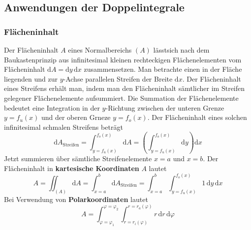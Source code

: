 \subsection{Anwendungen der Doppelintegrale}
\subsubsection{Flächeninhalt}
Der Flächeninhalt $A$ eines Normalbereichs $\left(A\right)$ lässtsich nach dem Baukastenprinzip aus infinitesimal kleinen rechteckigen Flächenelementen vom Flächeninhalt $\text{d}A=\text{d}y\,\text{d}x$ zusammensetzen. Man betrachte einen in der Fläche liegenden und zur $y$-Achse parallelen Streifen der Breite $\text{d}x$. Der Flächeninhalt eines Streifens erhält man, indem man den Flächeninhalt sämtlicher im Streifen gelegener Flächenelemente aufsummiert. Die Summation der Flächenelemente bedeutet eine Integration in der $y$-Richtung zwischen der unteren Grenze $y=f_u\left(x\right)$ und der oberen Grneze $y=f_o\left(x\right)$. Der Flächeninhalt eines solchen infinitesimal schmalen Streifens beträgt
\begin{equation}
\boxed{\text{d}A_{\text{Streifen}}=\displaystyle \int_{y=f_u\left(x\right)}^{f_o\left(x\right)}\text{d}A=\left(\displaystyle \int_{y=f_u\left(x\right)}^{f_o\left(x\right)}\text{d}y\right)\text{d}x}
\end{equation}
Jetzt summieren über sämtliche Streifenelemente $x=a$ und $x=b$. Der Flächeninhalt in \textbf{kartesische Koordinaten} $A$ lautet
\begin{equation}
\boxed{A=\displaystyle \iint_{\left(A\right)}\text{d}A=\displaystyle \int_{x=a}^{b}\text{d}A_{\text{Streifen}}=\displaystyle \int_{x=a}^b\displaystyle \int_{y=f_u\left(x\right)}^{f_o\left(x\right)}1\,\text{d}y\,\text{d}x}
\end{equation}
Bei Verwendung von \textbf{Polarkoordinaten} lautet 
\begin{equation}
\boxed{A=\displaystyle \int_{\varphi=\varphi_1}^{\varphi=\varphi_2}\displaystyle \int_{r=r_i\left(\varphi\right)}^{r=r_a\left(\varphi\right)}r\,\text{d}r\,\text{d}\varphi}
\end{equation}
